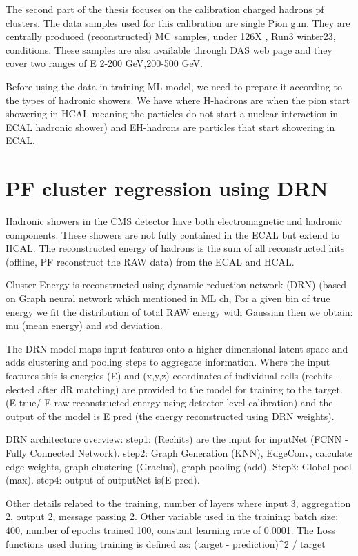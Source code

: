The second part of the thesis focuses on the calibration charged hadrons pf clusters.
The data samples used for this calibration are single Pion gun.
They are centrally produced (reconstructed) MC samples, under 126X %
, Run3 winter23, conditions. These samples are also available through DAS web page and they cover two ranges of E 2-200 GeV,200-500 GeV.  

Before using the data in training ML model, we need to prepare it according to the types of hadronic showers.
We have where H-hadrons are when the pion start showering in HCAL meaning the particles do not start a nuclear interaction in ECAL hadronic shower) and EH-hadrons are particles that start showering in ECAL. 


\section{PF cluster regression using DRN}

Hadronic showers in the CMS detector have both electromagnetic and hadronic components. These showers are not fully contained in the ECAL but extend to HCAL. The reconstructed energy of hadrons is the sum of all reconstructed hits (offline, PF reconstruct the RAW data) from the ECAL and HCAL. 


Cluster Energy is reconstructed using dynamic reduction network (DRN) (based on Graph neural network which mentioned in ML ch, %
For a given bin of true energy we fit the distribution of total RAW energy with Gaussian then we obtain: mu (mean energy) and std deviation.

The DRN model maps input features onto a higher dimensional latent space and adds clustering and pooling steps to aggregate information. Where the input features this is energies (E) and (x,y,z) coordinates of individual cells (rechits - elected after dR matching) are provided to the model for training to the target. (E true/ E raw reconstructed energy using detector level calibration) and the output of the model is E pred (the energy reconstructed using DRN weights).

DRN architecture overview:  
step1: (Rechits) are the input for inputNet (FCNN - Fully Connected Network). 
step2: Graph Generation (KNN), EdgeConv, calculate edge weights, graph clustering (Graclus), graph pooling (add). 
Step3: Global pool (max).  
step4: output of outputNet is(E pred).

Other details related to the training, number of layers where input 3, aggregation 2, output 2, message passing 2. Other variable used in the training: batch size: 400, number of epochs trained 100, constant learning rate of 0.0001. The Loss functions used during training is defined as: (target - prediction)^2 / target

